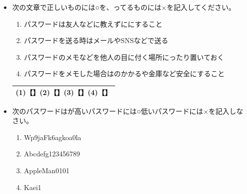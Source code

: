 \documentclass[a4paper,12pt]{jarticle}
\begin{document}
\begin{enumerate}
\begin{itemize}
                        \item
                            \theQuestion\label{Q:hasAnswer01-3} 次の文章で正しいものには○を、ってるものには×を記入してください。
                            \begin{enumerate}[label=\textbf{(\arabic*)}]
                              \item  パスワードは友人などに教えずににすること
                              \item  パスワードを送る時はメールやSNSなどで送る
                              \item  パスワードのメモなどを他人の目に付く場所にったり置いておく
                              \item パスワードをメモした場合はのかかるや金庫など安全にすること
                              \end{enumerate}
                              \begin{table}[htbp]
                                \centering
                              \begin{tabular}{|c|}
                                \hline
                                    (1)【\hspace{3pc}】(2)【\hspace{3pc}】(3)【\hspace{3pc}】(4)【\hspace{3pc}】\\
                                    \hline
                                \end{tabular}
                                \end{table}
                        \item
                            \theQuestion\label{Q:hasAnswer01-4} 次のパスワードはが高いパスワードには○低いパスワードには×を記入しなさい。
                            \begin{enumerate}[label=\textbf{(\arabic*)}]
                              \item  Wp9jaFk6agkoa0la
                              \item  Abcdefg123456789
                              \item  AppleMan0101
                              \item  Kaei1
                              \end{enumerate}

\end{itemize}
\end{enumerate}
\end{document}
